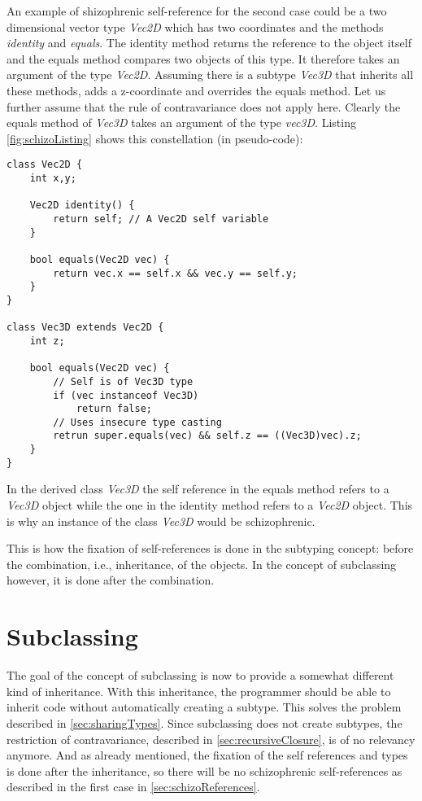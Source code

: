 An example of shizophrenic self-reference for the second case could be
a two dimensional vector type \emph{Vec2D} which has two coordinates
and the methods \emph{identity} and \emph{equals}. The identity method
returns the reference to the object itself and the equals method
compares two objects of this type. It therefore takes an argument
of the type \emph{Vec2D}. Assuming there is a subtype \emph{Vec3D}
that inherits all these methods, adds a z-coordinate and overrides the
equals method. Let us further assume that the rule of contravariance
does not apply here. Clearly the equals method of \emph{Vec3D} takes
an argument of the type \emph{vec3D}. Listing \ref{fig:schizoListing}
shows this constellation (in pseudo-code):

\begin{lstlisting}[caption={An example of schizophrenic self-reference},label={fig:schizoListing}]
class Vec2D {
	int x,y;

	Vec2D identity() {
		return self; // A Vec2D self variable
	}

	bool equals(Vec2D vec) {
		return vec.x == self.x && vec.y == self.y;
	}
}

class Vec3D extends Vec2D {
	int z;

	bool equals(Vec2D vec) {
		// Self is of Vec3D type
		if (vec instanceof Vec3D)
			return false;
		// Uses insecure type casting
		retrun super.equals(vec) && self.z == ((Vec3D)vec).z;
	}
}
\end{lstlisting}

In the derived class \emph{Vec3D} the self reference in the equals 
method refers to a \emph{Vec3D} object while the one in the identity method
refers to a \emph{Vec2D} object. This is why an instance of the class
\emph{Vec3D} would be schizophrenic.

This is how the fixation of self-references is done in the subtyping
concept: before the combination, i.e., inheritance, of the objects. In the
concept of subclassing however, it is done after the combination.

\section{Subclassing}

The goal of the concept of subclassing is now to provide a somewhat
different kind of inheritance. With this inheritance, the programmer
should be able to inherit code without automatically creating a subtype.
This solves the problem described in \cref{sec:sharingTypes}. Since
subclassing does not create subtypes, the restriction of contravariance,
described in \cref{sec:recursiveClosure}, is of no relevancy
anymore. And as already mentioned, the fixation of the self references
and types is done after the inheritance, so there will be no schizophrenic
self-references as described in the first case in \cref{sec:schizoReferences}. \\

